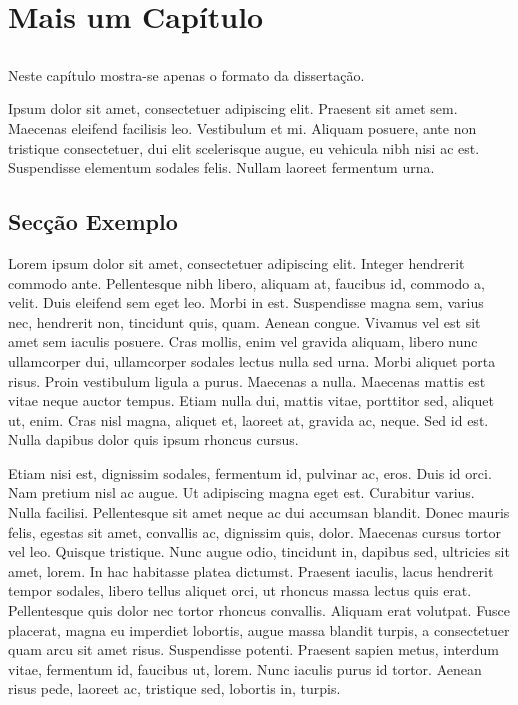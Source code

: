 \chapter{Mais um Capítulo}\label{chap:chap4}

\section*{}

Neste capítulo mostra-se apenas o formato da dissertação.

Ipsum dolor sit amet, consectetuer
adipiscing elit.  Praesent sit amet sem. 
Maecenas eleifend facilisis leo. Vestibulum et
mi. Aliquam posuere, ante non tristique consectetuer, dui elit
scelerisque augue, eu vehicula nibh nisi ac est. 
Suspendisse elementum sodales felis. 
Nullam laoreet fermentum urna. 

\section{Secção Exemplo}

Lorem ipsum dolor sit amet, consectetuer adipiscing elit. Integer
hendrerit commodo ante. Pellentesque nibh libero, aliquam at, faucibus
id, commodo a, velit. Duis eleifend sem eget leo. Morbi in
est. Suspendisse magna sem, varius nec, hendrerit non, tincidunt quis,
quam. Aenean congue. Vivamus vel est sit amet sem iaculis
posuere. Cras mollis, enim vel gravida aliquam, libero nunc
ullamcorper dui, ullamcorper sodales lectus nulla sed urna. Morbi
aliquet porta risus. Proin vestibulum ligula a purus. Maecenas a
nulla. Maecenas mattis est vitae neque auctor tempus. Etiam nulla dui,
mattis vitae, porttitor sed, aliquet ut, enim. Cras nisl magna,
aliquet et, laoreet at, gravida ac, neque. Sed id est. Nulla dapibus
dolor quis ipsum rhoncus cursus. 

Etiam nisi est, dignissim sodales, fermentum id, pulvinar ac,
eros. Duis id orci. Nam pretium nisl ac augue. Ut adipiscing magna
eget est. Curabitur varius. Nulla facilisi. Pellentesque sit amet
neque ac dui accumsan blandit. Donec mauris felis, egestas sit amet,
convallis ac, dignissim quis, dolor. Maecenas cursus tortor vel
leo. Quisque tristique. Nunc augue odio, tincidunt in, dapibus sed,
ultricies sit amet, lorem. In hac habitasse platea dictumst. Praesent
iaculis, lacus hendrerit tempor sodales, libero tellus aliquet orci,
ut rhoncus massa lectus quis erat. Pellentesque quis dolor nec tortor
rhoncus convallis. Aliquam erat volutpat. Fusce placerat, magna eu
imperdiet lobortis, augue massa blandit turpis, a consectetuer quam
arcu sit amet risus. Suspendisse potenti. Praesent sapien metus,
interdum vitae, fermentum id, faucibus ut, lorem. Nunc iaculis purus
id tortor. Aenean risus pede, laoreet ac, tristique sed, lobortis in,
turpis. 


